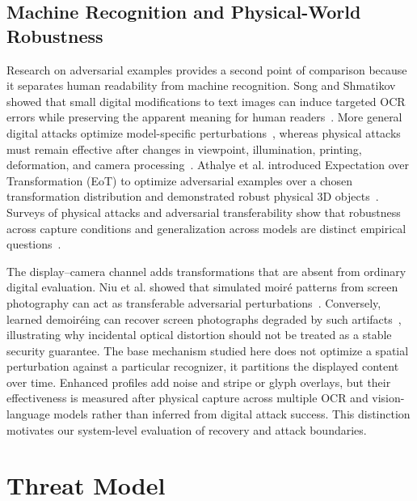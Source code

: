 \documentclass{ieeeaccess}
\begin{document}
\subsection{Machine Recognition and Physical-World Robustness}

Research on adversarial examples provides a second point of comparison because it separates human readability from machine recognition. Song and Shmatikov showed that small digital modifications to text images can induce targeted OCR errors while preserving the apparent meaning for human readers~\cite{b_song2018}. More general digital attacks optimize model-specific perturbations~\cite{b_goodfellow2015,b_madry2018,b_carlini2017}, whereas physical attacks must remain effective after changes in viewpoint, illumination, printing, deformation, and camera processing~\cite{b_eykholt2018,b_thys2019,b_xu2020}. Athalye et al. introduced Expectation over Transformation (EoT) to optimize adversarial examples over a chosen transformation distribution and demonstrated robust physical 3D objects~\cite{b_athalye2018}. Surveys of physical attacks and adversarial transferability show that robustness across capture conditions and generalization across models are distinct empirical questions~\cite{b_wei2024,b_gu2024}.

The display--camera channel adds transformations that are absent from ordinary digital evaluation. Niu et al. showed that simulated moir\'{e} patterns from screen photography can act as transferable adversarial perturbations~\cite{b_niu2021}. Conversely, learned demoir\'{e}ing can recover screen photographs degraded by such artifacts~\cite{b_demoire2018}, illustrating why incidental optical distortion should not be treated as a stable security guarantee. The base mechanism studied here does not optimize a spatial perturbation against a particular recognizer, it partitions the displayed content over time. Enhanced profiles add noise and stripe or glyph overlays, but their effectiveness is measured after physical capture across multiple OCR and vision-language models rather than inferred from digital attack success. This distinction motivates our system-level evaluation of recovery and attack boundaries.


\section{Threat Model}
\label{sec:threat}
\end{document}
